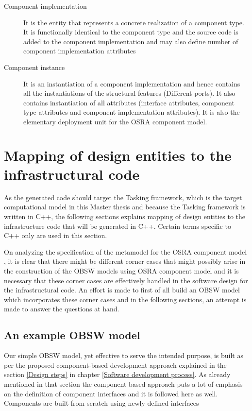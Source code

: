 \begin{description}
\item [Component implementation] It is the entity that represents a concrete realization of a component type. It is functionally identical to the component type and the source code is added to the component implementation and may also define number of component implementation attributes

\item [Component instance] It is an instantiation of a component implementation and hence contains all the instantiations of the structural features (Different ports). It also contains instantiation of all attributes (interface attributes, component type attributes and component implementation attributes). It is also the elementary deployment unit for the OSRA component model.        
\end{description}

\section{Mapping of design entities to the infrastructural code}
As the generated code should target the Tasking framework, which is the target computational model in this Master thesis and because the Tasking framework is written in C++, the following sections explains mapping of design entities to the infrastructure code that will be generated in C++. Certain terms specific to C++ only are used in this section.

On analyzing the specification of the metamodel for the OSRA component model \cite{SpecMetamodel}, it is clear that there might be different corner cases that might possibly arise in the construction of the OBSW models using OSRA component model and it is necessary that these corner cases are effectively handled in the software design for the infrastructural code. An effort is made to first of all build an OBSW model which incorporates these corner cases and in the following sections, an attempt is made to answer the questions at hand.

\subsection{An example OBSW model}
Our simple OBSW model, yet effective to serve the intended purpose, is built as per the proposed component-based development approach explained in the section \cref{Design steps} in chapter \cref{Software development process}. As already mentioned in that section the component-based approach puts a lot of emphasis on the definition of component interfaces \cite{CompBasedProcess} and it is followed here as well. Components are built from scratch using newly defined interfaces


